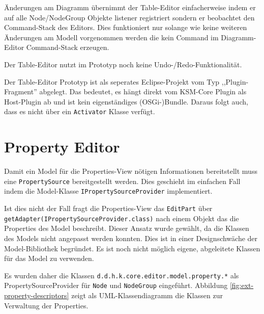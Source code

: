 \documentclass[%
12pt,titlepage,abstracton]{scrreprt}
\begin{document}
Änderungen am Diagramm übernimmt der Table-Editor einfacherweise indem er auf
alle Node/NodeGroup Objekte listener registriert sondern er beobachtet den
Command-Stack des Editors. Dies funktioniert nur solange wie keine weiteren
Änderungen am Modell vorgenommen werden die kein Command im Diagramm-Editor
Command-Stack erzeugen.

Der Table-Editor nutzt im Prototyp noch keine Undo-/Redo-Funktionalität.

Der Table-Editor Prototyp ist als seperates Eclipse-Projekt vom Typ
,,Plugin-Fragment'' abgelegt. Das bedeutet, es hängt direkt vom KSM-Core Plugin
als Host-Plugin ab und ist kein eigenständiges (OSGi-)Bundle. Daraus folgt auch,
dass es nicht über ein \texttt{Activator} Klasse verfügt.

\section{Property Editor}
Damit ein Model für die Properties-View nötigen Informationen bereitstellt muss
eine \texttt{Prop\-erty\-Source} bereitgestellt werden. Dies geschieht im
einfachen Fall indem die Model-Klasse \texttt{IProp\-erty\-Source\-Provider} implementiert.

Ist dies nicht der Fall fragt die Properties-View das \texttt{EditPart} über
\texttt{getAdapter\-(IProp\-erty\-Source\-Provider.class)} nach einem Objekt das
die Properties des Model beschreibt. Dieser Ansatz wurde gewählt, da die
Klassen des Models nicht angepasst werden konnten. Dies ist in einer
Designschwäche der Model-Bibliothek begründet. Es ist noch nicht möglich eigene,
abgeleitete Klassen für das Model zu verwenden.

Es wurden daher die Klassen \texttt{d.d.h.k.core.\-editor.\-model.\-property.*}
als PropertySourceProvider für \texttt{Node} und \texttt{NodeGroup} eingeführt.
Abbildung \ref{fig:ext-property-descriptors} zeigt als UML-Klassendiagramm die
Klassen zur Verwaltung der Properties.
\end{document}
